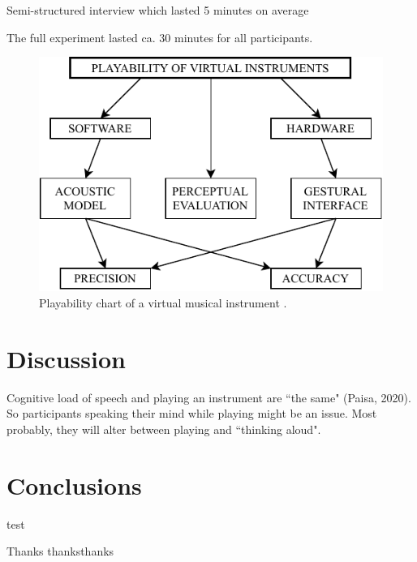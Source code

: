 \documentclass{article}
\begin{document}
Semi-structured interview which lasted 5 minutes on average

The full experiment lasted ca. 30 minutes for all participants.

\begin{figure}[ht]\includegraphics[width=1.0\columnwidth]{SMC 2020 paper template LaTeX/figures/PlayabilityChart.pdf}
\centering
  \caption{Playability chart of a virtual musical instrument \cite{Young2003}. \label{fig:oculusController}}
\end{figure}

\section{Discussion}\label{sec:discussion}
Cognitive load of speech and playing an instrument are ``the same" (Paisa, 2020). So participants speaking their mind while playing might be an issue. Most probably, they will alter between playing and ``thinking aloud". 

\section{Conclusions}
test

\begin{acknowledgments}
Thanks thanksthanks
\end{acknowledgments} 


\end{document}
